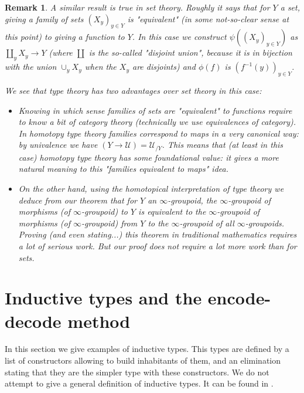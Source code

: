 \documentclass{article}
\newcommand{\se}[1]{\medbreak \medbreak \section{#1}}
\newcommand{\U}{{\mathcal U}}
\renewcommand{\r}{\rightarrow}
\newtheorem{remark}{Remark}
\begin{document}
\begin{remark}
A similar result is true in set theory. Roughly it says that for $Y$ a set, giving a family of sets $(X_y)_{y\in Y}$ is "equivalent" (in some not-so-clear sense at this point) to giving a function to $Y$. In this case we construct $\psi((X_y)_{y\in Y})$ as $\coprod_y X_y \r Y$ (where $\coprod$ is the so-called "disjoint union", because it is in bijection with the union $\cup_yX_y$ when the $X_y$ are disjoints) and $\phi(f)$ is $(f^{-1}(y))_{y\in Y}$.

We see that type theory has two advantages over set theory in this case:
\begin{itemize}
\item Knowing in which sense families of sets are "equivalent" to functions require to know a bit of category theory (technically we use equivalences of category). In homotopy type theory families correspond to maps in a very canonical way: by univalence we have $(Y\r \U) = \U_{/Y}$. This means that (at least in this case) homotopy type theory has some foundational value: it gives a more natural meaning to this "families equivalent to maps" idea. %
\item On the other hand, using the homotopical interpretation of type theory we deduce from our theorem that for $Y$ an $\infty$-groupoid, the $\infty$-groupoid of morphisms (of $\infty$-groupoid) to $Y$ is equivalent to the $\infty$-groupoid of morphisms (of $\infty$-groupoid) from $Y$ to the $\infty$-groupoid of all $\infty$-groupoids. Proving (and even stating...) this theorem in traditional mathematics requires a lot of serious work. But our proof does not require a lot more work than for sets.
\end{itemize}
\end{remark}








\se{Inductive types and the encode-decode method}

In this section we give examples of inductive types. This types are defined by a list of constructors allowing to build inhabitants of them, and an elimination stating that they are the simpler type with these constructors. We do not attempt to give a general definition of inductive types. It can be found in \cite{dybjer1994inductive}. %
\end{document}
